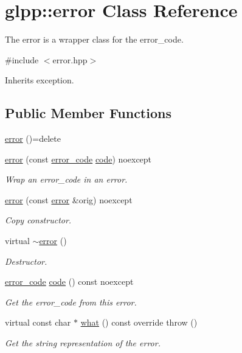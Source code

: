 \hypertarget{classglpp_1_1error}{}\section{glpp\+:\+:error Class Reference}
\label{classglpp_1_1error}


The error is a wrapper class for the error\+\_\+code.  




{\ttfamily \#include $<$error.\+hpp$>$}



Inherits exception.

\subsection*{Public Member Functions}
\begin{DoxyCompactItemize}
\item 
\hyperlink{classglpp_1_1error_aca53147c703f90cced018e8592ef28ea}{error} ()=delete
\item 
\hyperlink{classglpp_1_1error_a622ee219a83b275ea965f74b55e277de}{error} (const \hyperlink{namespaceglpp_a1fe5e1dcc793337b3958e3cd2352432c}{error\+\_\+code} \hyperlink{classglpp_1_1error_a36c978058800d46310de3638be3f1ca6}{code}) noexcept
\begin{DoxyCompactList}\small\item\em Wrap an error\+\_\+code in an error. \end{DoxyCompactList}\item 
\hyperlink{classglpp_1_1error_a7ccd8e96ad2f93ac0ec7e3803edab882}{error} (const \hyperlink{classglpp_1_1error}{error} \&orig) noexcept
\begin{DoxyCompactList}\small\item\em Copy constructor. \end{DoxyCompactList}\item 
virtual \hyperlink{classglpp_1_1error_a631399936338b9720b1938c8a8eee2a2}{$\sim$error} ()
\begin{DoxyCompactList}\small\item\em Destructor. \end{DoxyCompactList}\item 
\hyperlink{namespaceglpp_a1fe5e1dcc793337b3958e3cd2352432c}{error\+\_\+code} \hyperlink{classglpp_1_1error_a36c978058800d46310de3638be3f1ca6}{code} () const noexcept
\begin{DoxyCompactList}\small\item\em Get the error\+\_\+code from this error. \end{DoxyCompactList}\item 
virtual const char $\ast$ \hyperlink{classglpp_1_1error_aa8a4425f1cc890c40a9992fe883cf3bc}{what} () const override  throw ()
\begin{DoxyCompactList}\small\item\em Get the string representation of the error. \end{DoxyCompactList}\end{DoxyCompactItemize}


